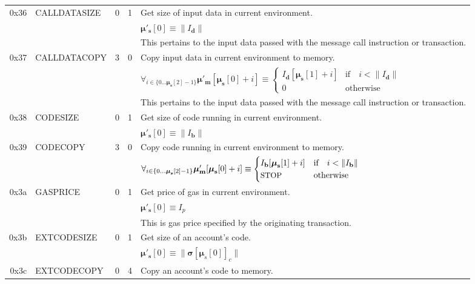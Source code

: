 \documentclass[9pt,oneside]{amsart}
\begin{document}
\begin{tabular*}{\columnwidth}[h]{rlrrl}
\midrule
0x36 & {\small CALLDATASIZE} & 0 & 1 & Get size of input data in current environment. \\
&&&& $\boldsymbol{\mu}'_\mathbf{s}[0] \equiv \lVert I_\mathbf{d} \rVert$ \\
&&&& This pertains to the input data passed with the message call instruction or transaction. \\
\midrule
0x37 & {\small CALLDATACOPY} & 3 & 0 & Copy input data in current environment to memory. \\
&&&& $\forall_{i \in \{ 0 \dots \boldsymbol{\mu}_\mathbf{s}[2] - 1\} } \boldsymbol{\mu}'_\mathbf{m}[\boldsymbol{\mu}_\mathbf{s}[0] + i ] \equiv
\begin{cases} I_\mathbf{d}[\boldsymbol{\mu}_\mathbf{s}[1] + i] & \text{if} \quad i < \lVert I_\mathbf{d} \rVert \\ 0 & \text{otherwise} \end{cases}$\\
&&&& This pertains to the input data passed with the message call instruction or transaction. \\
\midrule
0x38 & {\small CODESIZE} & 0 & 1 & Get size of code running in current environment. \\
&&&& $\boldsymbol{\mu}'_\mathbf{s}[0] \equiv \lVert I_\mathbf{b} \rVert$ \\
\midrule
0x39 & {\small CODECOPY} & 3 & 0 & Copy code running in current environment to memory. \\
&&&& $\forall_{i \in \{ 0 \dots \boldsymbol{\mu}_\mathbf{s}[2] - 1\} } \boldsymbol{\mu}'_\mathbf{m}[\boldsymbol{\mu}_\mathbf{s}[0] + i ] \equiv
\begin{cases} I_\mathbf{b}[\boldsymbol{\mu}_\mathbf{s}[1] + i] & \text{if} \quad i < \lVert I_\mathbf{b} \rVert \\ \text{\small STOP} & \text{otherwise} \end{cases}$\\
\midrule
0x3a & {\small GASPRICE} & 0 & 1 & Get price of gas in current environment. \\
&&&& $\boldsymbol{\mu}'_\mathbf{s}[0] \equiv I_p$ \\
&&&& This is gas price specified by the originating transaction.\\
\midrule
0x3b & {\small EXTCODESIZE} & 0 & 1 & Get size of an account's code. \\
&&&& $\boldsymbol{\mu}'_\mathbf{s}[0] \equiv \lVert \boldsymbol{\sigma}[\boldsymbol{\mu}_s[0]]_c \rVert$ \\
\midrule
0x3c & {\small EXTCODECOPY} & 0 & 4 & Copy an account's code to memory. \\

\end{tabular*}
\end{document}
